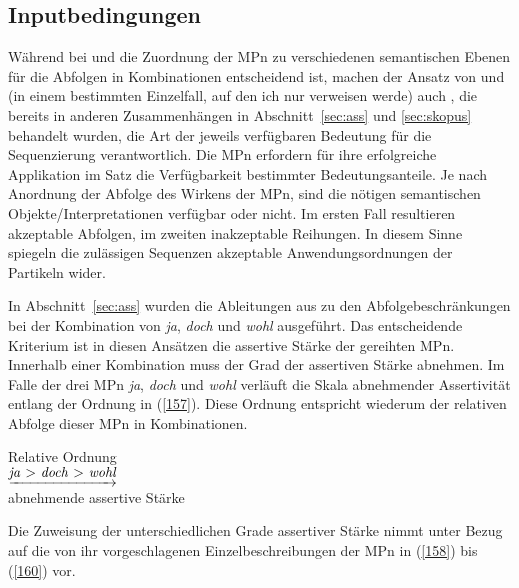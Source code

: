 \subsection{Inputbedingungen}
\label{subsec:input}
Während bei \citet{Vismans1994} und \citet{Ickler1994} die Zuordnung der MPn zu verschiedenen semantischen Ebenen für die Abfolgen in Kombinationen entscheidend ist, machen der Ansatz von \citet{Doherty1985} und (in einem bestimmten Einzelfall, auf den ich nur verweisen werde) auch \citet{Rinas2007}, die bereits in anderen Zusammenhängen in Abschnitt~\ref{sec:ass} und \ref{sec:skopus} behandelt wurden, die Art der jeweils verfügbaren Bedeutung für die Sequenzierung verantwortlich. Die MPn erfordern für ihre erfolgreiche Applikation im Satz die Verfügbarkeit bestimmter Bedeutungsanteile. Je nach Anordnung der Abfolge des Wirkens der MPn, sind die nötigen semantischen Objekte/Interpretationen verfügbar oder nicht. Im ersten Fall resultieren akzeptable Abfolgen, im zweiten inakzeptable Reihungen. In diesem Sinne spiegeln die zulässigen Sequenzen akzeptable Anwendungsordnungen der Partikeln wider.

In Abschnitt~\ref{sec:ass} wurden die Ableitungen aus \citet{Doherty1985, Doherty1987} zu den Abfolgebeschränkungen bei der Kombination von \textit{ja}, \textit{doch} und \textit{wohl} ausgeführt. Das entscheidende Kriterium ist in diesen Ansätzen die assertive Stärke  der ge\-reihten MPn. Innerhalb einer Kombination muss der Grad der assertiven Stärke abnehmen. Im Falle der drei MPn \textit{ja}, \textit{doch} und \textit{wohl} verläuft die Skala abnehmender Assertivität entlang der Ordnung in (\ref{157}). Diese Ordnung entspricht wiederum der relativen Abfolge dieser MPn in Kombinationen.

\noindent\parbox{\textwidth}{\begin{exe}
	\ex\label{157} 
	Relative Ordnung\\
	$\underrightarrow{\text{\textit{ja} > \textit{doch} > \textit{wohl}}}$\\
	abnehmende assertive Stärke
\end{exe}}	
Die Zuweisung der unterschiedlichen Grade assertiver Stärke nimmt \citet{Doherty1985} unter Bezug auf die von ihr vorgeschlagenen Einzelbeschreibungen der MPn in (\ref{158}) bis (\ref{160}) vor.

